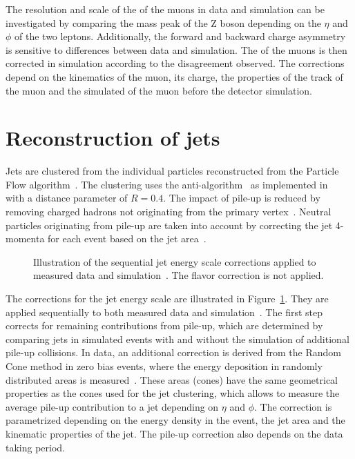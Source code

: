 The resolution and scale of the \pt of the muons in data and simulation can be investigated by comparing the mass peak of the Z boson depending on the $\eta$ and $\phi$ of the two leptons.
Additionally, the forward and backward charge asymmetry is sensitive to differences between data and simulation.
The \pt of the muons is then corrected in simulation according to the disagreement observed. The corrections depend on the kinematics of the muon, its charge, the properties of the track of the muon and the simulated \pt
of the muon before the detector simulation.

\section{Reconstruction of jets}
\label{sec:SimReco_jetReco}

Jets are clustered from the individual particles reconstructed from the Particle Flow algorithm~\cite{CMS-PAS-JME-16-003}.
The clustering uses the anti-\kt algorithm~\cite{Cacciari:2008gp} as implemented in \FASTJET~\cite{Cacciari:2011ma} with a distance parameter of $R = 0.4$.
The impact of pile-up is reduced by removing charged hadrons not originating from the primary vertex~\cite{CMS-PAS-JME-14-001}.
Neutral particles originating from pile-up are taken into account by correcting the jet 4-momenta for each event based on the jet area~\cite{1126-6708-2008-04-005,CACCIARI2008119}.

\begin{figure}[htbp!]
  \begin{center}
\caption{Illustration of the sequential jet energy scale corrections applied to measured data and simulation~\cite{Khachatryan:2016kdb}. The flavor correction is not applied.
  \label{fig:reco_jec}}
  \end{center}
\end{figure}


The corrections for the jet energy scale are illustrated in Figure~\ref{fig:reco_jec}. They are applied sequentially to both measured data and simulation~\cite{Khachatryan:2016kdb,CMS-PAS-JME-16-003}.
The first step corrects for remaining contributions from pile-up, which are determined by comparing jets in simulated events with and without the simulation of additional pile-up collisions.
In data, an additional correction is derived from the Random Cone method in zero bias events, where the energy deposition in randomly distributed areas is measured~\cite{1748-0221-6-11-P11002}. These areas (cones) have the same geometrical properties as the cones used for the jet clustering, which allows to measure the average pile-up contribution to a jet depending on $\eta$ and $\phi$. The correction is parametrized depending on the energy density in the event, the jet area and the kinematic
properties of the jet. The pile-up correction also depends on the data taking period.

